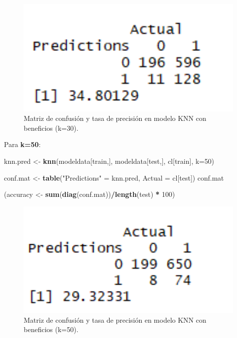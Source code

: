 \documentclass[spanish,]{article}
\newenvironment{Shaded}{\begin{snugshade}}{\end{snugshade}}
\newcommand{\KeywordTok}[1]{\textcolor[rgb]{0.13,0.29,0.53}{\textbf{#1}}}
\newcommand{\DataTypeTok}[1]{\textcolor[rgb]{0.13,0.29,0.53}{#1}}
\newcommand{\DecValTok}[1]{\textcolor[rgb]{0.00,0.00,0.81}{#1}}
\newcommand{\StringTok}[1]{\textcolor[rgb]{0.31,0.60,0.02}{#1}}
\newcommand{\OperatorTok}[1]{\textcolor[rgb]{0.81,0.36,0.00}{\textbf{#1}}}
\newcommand{\NormalTok}[1]{#1}
\begin{document}
\begin{figure}[h]
    \centering
    \includegraphics[width=1\textwidth]{figuras/KNN/benefits_k30.png}
    \caption{Matriz de confusión y tasa de precisión en modelo KNN con beneficios (k=30).}
    \label{fig:KNN:benefitsK30}
\end{figure}

Para \textbf{k=50}:

\begin{Shaded}
\begin{Highlighting}[]
\NormalTok{knn.pred <-}\StringTok{ }\KeywordTok{knn}\NormalTok{(modeldata[train,], modeldata[test,], cl[train], }\DataTypeTok{k=}\DecValTok{50}\NormalTok{) }

\NormalTok{conf.mat <-}\StringTok{ }\KeywordTok{table}\NormalTok{(}\StringTok{"Predictions"}\NormalTok{ =}\StringTok{ }\NormalTok{knn.pred, }\DataTypeTok{Actual =}\NormalTok{ cl[test])}
\NormalTok{conf.mat}

\NormalTok{(accuracy <-}\StringTok{ }\KeywordTok{sum}\NormalTok{(}\KeywordTok{diag}\NormalTok{(conf.mat))}\OperatorTok{/}\KeywordTok{length}\NormalTok{(test) }\OperatorTok{*}\StringTok{ }\DecValTok{100}\NormalTok{)}
\end{Highlighting}
\end{Shaded}

\begin{figure}[h]
    \centering
    \includegraphics[width=1\textwidth]{figuras/KNN/benefits_k50.png}
    \caption{Matriz de confusión y tasa de precisión en modelo KNN con beneficios (k=50).}
    \label{fig:KNN:benefitsK50}
\end{figure}
\end{document}
